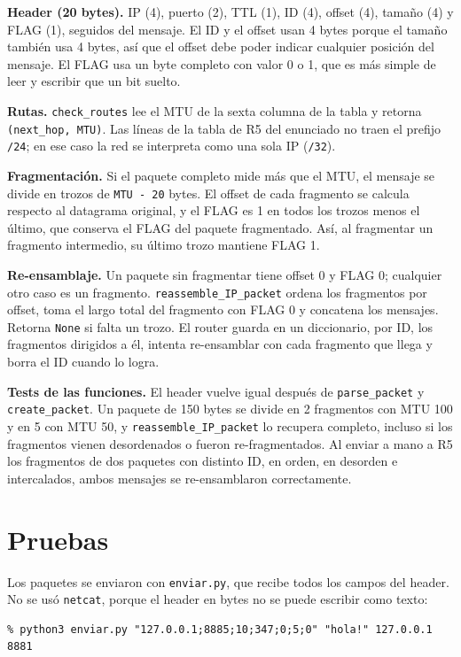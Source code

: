 \documentclass[11pt,letterpaper]{article}
\begin{document}
\textbf{Header (20 bytes).} IP (4), puerto (2), TTL (1), ID (4), offset (4), tamaño (4) y
FLAG (1), seguidos del mensaje. El ID y el offset usan 4 bytes porque el tamaño también usa
4 bytes, así que el offset debe poder indicar cualquier posición del mensaje. El FLAG usa un
byte completo con valor 0 o 1, que es más simple de leer y escribir que un bit suelto.

\textbf{Rutas.} \texttt{check\_routes} lee el MTU de la sexta columna de la tabla y retorna
\texttt{(next\_hop, MTU)}. Las líneas de la tabla de R5 del enunciado no traen el prefijo
\texttt{/24}; en ese caso la red se interpreta como una sola IP (\texttt{/32}).

\textbf{Fragmentación.} Si el paquete completo mide más que el MTU, el mensaje se divide
en trozos de \texttt{MTU - 20} bytes. El offset de cada fragmento se calcula respecto al
datagrama original, y el FLAG es 1 en todos los trozos menos el último, que conserva el
FLAG del paquete fragmentado. Así, al fragmentar un fragmento intermedio, su último trozo
mantiene FLAG 1.

\textbf{Re-ensamblaje.} Un paquete sin fragmentar tiene offset 0 y FLAG 0; cualquier otro
caso es un fragmento. \texttt{reassemble\_IP\_packet} ordena los fragmentos por offset,
toma el largo total del fragmento con FLAG 0 y concatena los mensajes. Retorna
\texttt{None} si falta un trozo. El router guarda en un diccionario, por ID, los fragmentos
dirigidos a él, intenta re-ensamblar con cada fragmento que llega y borra el ID cuando lo
logra.

\textbf{Tests de las funciones.} El header vuelve igual después de \texttt{parse\_packet}
y \texttt{create\_packet}. Un paquete de 150 bytes se divide en 2 fragmentos con MTU 100 y
en 5 con MTU 50, y \texttt{reassemble\_IP\_packet} lo recupera completo, incluso si los
fragmentos vienen desordenados o fueron re-fragmentados. Al enviar a mano a R5 los
fragmentos de dos paquetes con distinto ID, en orden, en desorden e intercalados, ambos
mensajes se re-ensamblaron correctamente.

\section{Pruebas}

Los paquetes se enviaron con \texttt{enviar.py}, que recibe todos los campos del header. No
se usó \texttt{netcat}, porque el header en bytes no se puede escribir como texto:

\begin{lstlisting}
% python3 enviar.py "127.0.0.1;8885;10;347;0;5;0" "hola!" 127.0.0.1 8881
\end{lstlisting}
\end{document}
